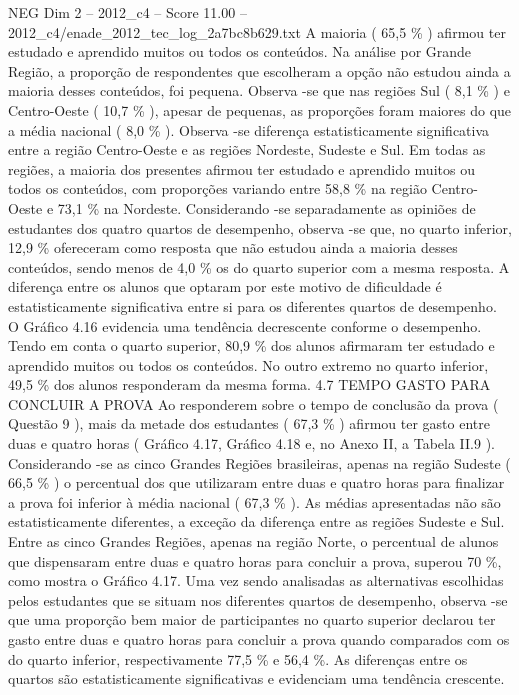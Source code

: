 \begin{textsample}{NEG Dim 2 – 2012\_c4 – Score 11.00 – 2012\_c4/enade\_2012\_tec\_log\_2a7bc8b629.txt}
A maioria ( 65,5 \% ) afirmou ter estudado e aprendido muitos ou todos os conteúdos.
Na análise por Grande Região, a proporção de respondentes que escolheram a opção não estudou ainda a maioria desses conteúdos, foi pequena.
Observa -se que nas regiões Sul ( 8,1 \% ) e Centro-Oeste ( 10,7 \% ), apesar de pequenas, as proporções foram maiores do que a média nacional ( 8,0 \% ).
Observa -se diferença estatisticamente significativa entre a região Centro-Oeste e as regiões Nordeste, Sudeste e Sul.
Em todas as regiões, a maioria dos presentes afirmou ter estudado e aprendido muitos ou todos os conteúdos, com proporções variando entre 58,8 \% na região Centro-Oeste e 73,1 \% na Nordeste.
Considerando -se separadamente as opiniões de estudantes dos quatro quartos de desempenho, observa -se que, no quarto inferior, 12,9 \% ofereceram como resposta que não estudou ainda a maioria desses conteúdos, sendo menos de 4,0 \% os do quarto superior com a mesma resposta.
A diferença entre os alunos que optaram por este motivo de dificuldade é estatisticamente significativa entre si para os diferentes quartos de desempenho.
O Gráfico 4.16 evidencia uma tendência decrescente conforme o desempenho.
Tendo em conta o quarto superior, 80,9 \% dos alunos afirmaram ter estudado e aprendido muitos ou todos os conteúdos.
No outro extremo no quarto inferior, 49,5 \% dos alunos responderam da mesma forma. 4.7 TEMPO GASTO PARA CONCLUIR A PROVA Ao responderem sobre o tempo de conclusão da prova ( Questão 9 ), mais da metade dos estudantes ( 67,3 \% ) afirmou ter gasto entre duas e quatro horas ( Gráfico 4.17, Gráfico 4.18 e, no Anexo II, a Tabela II.9 ).
Considerando -se as cinco Grandes Regiões brasileiras, apenas na região Sudeste ( 66,5 \% ) o percentual dos que utilizaram entre duas e quatro horas para finalizar a prova foi inferior à média nacional ( 67,3 \% ).
As médias apresentadas não são estatisticamente diferentes, a exceção da diferença entre as regiões Sudeste e Sul.
Entre as cinco Grandes Regiões, apenas na região Norte, o percentual de alunos que dispensaram entre duas e quatro horas para concluir a prova, superou 70 \%, como mostra o Gráfico 4.17.
Uma vez sendo analisadas as alternativas escolhidas pelos estudantes que se situam nos diferentes quartos de desempenho, observa -se que uma proporção bem maior de participantes no quarto superior declarou ter gasto entre duas e quatro horas para concluir a prova quando comparados com os do quarto inferior, respectivamente 77,5 \% e 56,4 \%.
As diferenças entre os quartos são estatisticamente significativas e evidenciam uma tendência crescente.

\end{textsample}
